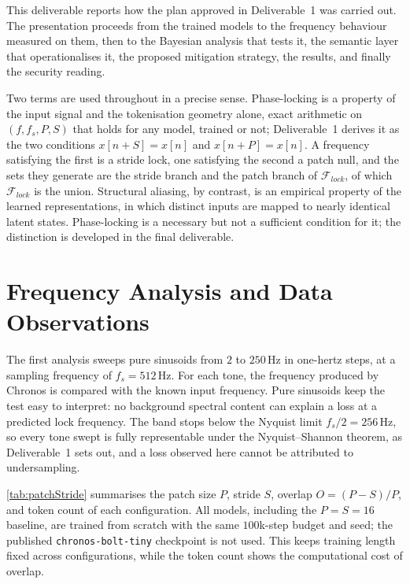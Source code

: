 \newcommand{\tofill}[1]{{\color{red}\small[\textsc{to fill}, #1]}}

This deliverable reports how the plan approved in Deliverable~1 was carried out. The presentation proceeds from the trained models to the frequency behaviour measured on them, then to the Bayesian analysis that tests it, the semantic layer that operationalises it, the proposed mitigation strategy, the results, and finally the security reading.

Two terms are used throughout in a precise sense. Phase-locking is a property of the input signal and the tokenisation geometry alone, exact arithmetic on $(f,f_s,P,S)$ that holds for any model, trained or not; Deliverable~1 derives it as the two conditions $x[n+S]=x[n]$ and $x[n+P]=x[n]$. A frequency satisfying the first is a stride lock, one satisfying the second a patch null, and the sets they generate are the stride branch and the patch branch of $\mathcal F_{lock}$, of which $\mathcal F_{lock}$ is the union. Structural aliasing, by contrast, is an empirical property of the learned representations, in which distinct inputs are mapped to nearly identical latent states. Phase-locking is a necessary but not a sufficient condition for it; the distinction is developed in the final deliverable.

\section{Frequency Analysis and Data Observations}
\label{sec:analysis}



The first analysis sweeps pure sinusoids from $2$ to $250$\,Hz in one-hertz steps, at a sampling frequency of $f_s=512$\,Hz. For each tone, the frequency produced by Chronos is compared with the known input frequency. Pure sinusoids keep the test easy to interpret: no background spectral content can explain a loss at a predicted lock frequency. The band stops below the Nyquist limit $f_s/2=256$\,Hz, so every tone swept is fully representable under the Nyquist--Shannon theorem, as Deliverable~1 sets out, and a loss observed here cannot be attributed to undersampling.

\autoref{tab:patchStride} summarises the patch size $P$, stride $S$, overlap $O=(P-S)/P$, and token count of each configuration. All models, including the $P{=}S{=}16$ baseline, are trained from scratch with the same $100$k-step budget and seed; the published \texttt{chronos-bolt-tiny} checkpoint is not used. This keeps training length fixed across configurations, while the token count shows the computational cost of overlap.

